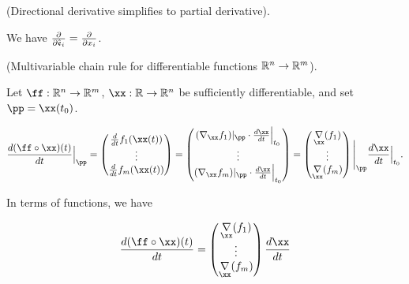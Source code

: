 \begin{remark}
    (Directional derivative simplifies to partial derivative).
    
    We have $\frac{\partial}{\partial \hat{\mathfrak{e}}_i} = \frac{\partial}{\partial x_i}$.
\end{remark}

\begin{lemma}
    (Multivariable chain rule for differentiable functions $\mathbb{R}^n \rightarrow \mathbb{R}^m$).
    
    Let $\ff:\R^n \rightarrow \R^m$, $\xx:\R \rightarrow \R^n$ be sufficiently differentiable, and set $\pp = \xx(t_0)$.
    
    \begin{align*}
        \frac{d (\ff \circ \xx)(t)}{dt}\Big|_\pp
        =
        \begin{pmatrix}
            \frac{d}{dt} f_1(\xx(t))
            \\
            \vdots
            \\
            \frac{d}{dt} f_m(\xx(t))
        \end{pmatrix}
        =
        \begin{pmatrix}
            (\nabla_\xx f_1)|_\pp \cdot \frac{d\xx}{dt}\Big|_{t_0}
            \\
            \vdots
            \\
            (\nabla_\xx f_m)|_\pp \cdot \frac{d\xx}{dt}\Big|_{t_0}
        \end{pmatrix}
        =
        \begin{pmatrix}
            \underset{\xx}{\nabla} (f_1)
            \\
            \vdots
            \\
            \underset{\xx}{\nabla} (f_m)
        \end{pmatrix}
        \Bigg|_\pp
        \frac{d \xx}{d t}\Big|_{t_0}.
    \end{align*}
    
    In terms of functions, we have
    
    \begin{align*}
        \frac{d (\ff \circ \xx)(t)}{dt}
        =
        \begin{pmatrix}
            \underset{\xx}{\nabla} (f_1)
            \\
            \vdots
            \\
            \underset{\xx}{\nabla} (f_m)
        \end{pmatrix}
        \frac{d \xx}{d t}
    \end{align*}
    

\end{lemma}
